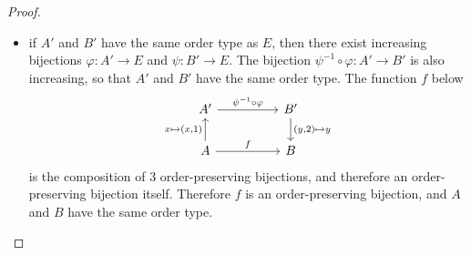 \documentclass[11pt,a4paper,twoside]{article}
\theoremstyle{definition}
\begin{document}
\begin{proof}
\begin{enumerate}[(a)]
\begin{itemize}
      \item if $A'$ and $B'$ have the same order type as $E$, then there exist increasing bijections $\varphi : A' \to E$
        and $\psi : B' \to E$. The bijection $\psi^{-1} \circ \varphi : A' \to B'$ is also increasing, so that $A'$ and
        $B'$ have the same order type. The function $f$ below
        \begin{equation*}
          \begin{tikzcd}[column sep = huge]
            A' \arrow{r}{\psi^{-1} \circ \varphi}
               & B' \arrow{d}{( y, 2 ) \mapsto y} \\
               A \arrow{r}{f}
                 \arrow{u}{x \mapsto ( x, 1 )}
               & B
          \end{tikzcd}
        \end{equation*}
        is the composition of 3 order-preserving bijections, and therefore an order-preserving bijection itself.
        Therefore $f$ is an order-preserving bijection, and $A$ and $B$ have the same order type.


\end{itemize}
\end{enumerate}
\end{proof}
\end{document}
